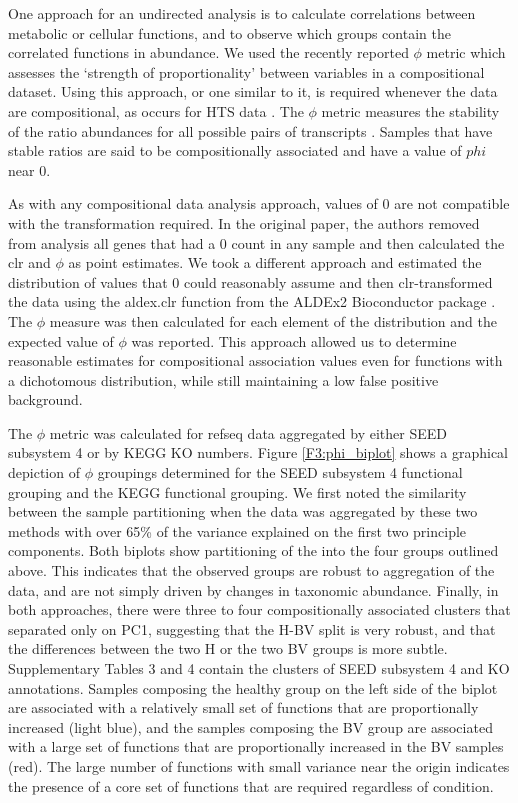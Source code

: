 \documentclass[10pt,letterpaper]{article}
\begin{document}
One approach for an undirected analysis is to calculate correlations between metabolic or cellular functions, and to observe which groups contain the correlated functions in abundance. We used the recently reported $\phi$ metric \cite{Lovell:2-015} which assesses the `strength of proportionality' between variables in a compositional dataset. Using this approach, or one similar to it, is required whenever the data are compositional, as occurs for HTS data \cite{Friedman:2012, Lovell:2015, Kurtz:2015}. The $\phi$ metric measures the stability of the ratio abundances for all possible pairs of transcripts \cite{Lovell:2015}. Samples that have stable ratios are said to be compositionally associated and have a value of $phi$ near 0. 

As with any compositional data analysis approach, values of 0 are not compatible with the transformation required. In the original paper, the authors removed from analysis all genes that had a 0 count in any sample and then calculated the clr and $\phi$ as point estimates. We took a different approach and estimated the distribution of values that 0 could reasonably assume and then clr-transformed the data using the aldex.clr function from the ALDEx2 Bioconductor package \cite{fernandes:2013, fernandes:2014}. The $\phi$ measure was then calculated for each  element of the distribution and the expected value of $\phi$ was reported. This approach allowed us to determine reasonable estimates for compositional association values even for functions with a dichotomous distribution, while still maintaining a low false positive background. 

The $\phi$ metric was calculated for refseq data aggregated by either SEED subsystem 4 or by KEGG KO numbers. Figure \ref{F3:phi_biplot} shows a graphical depiction of $\phi$ groupings determined for the SEED subsystem 4 functional grouping and the KEGG functional grouping. We first noted the similarity between the sample partitioning when the data was aggregated by these two methods with over 65\% of the variance explained on the first two principle components. Both biplots show partitioning of the into the four groups outlined above. This indicates that the observed groups are robust to aggregation of the data, and are not simply driven by changes in taxonomic abundance. Finally, in both approaches, there were three to four compositionally associated clusters that separated only on PC1, suggesting that the H-BV split is very robust, and that the differences between the two H or the two BV groups is more subtle. Supplementary Tables 3 and 4 contain the clusters of SEED subsystem 4 and KO annotations. Samples composing the healthy group on the left side of the biplot are associated with a relatively small set of functions that are proportionally increased (light blue), and the samples composing the BV group are associated with a large set of functions that are proportionally increased in the BV samples (red).  The large number of functions with small variance near the origin indicates the presence of a core set of functions that are required regardless of condition. 
\end{document}

